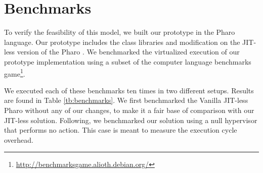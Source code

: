 %

\section{Benchmarks}

To verify the feasibility of this model, we built our \Vtt prototype in the Pharo language. Our prototype includes the \Vtt class libraries and modification on the JIT-less version of the Pharo \VM.
We benchmarked the virtualized execution of our prototype implementation using a subset of the computer language benchmarks game\footnote{\url{http://benchmarksgame.alioth.debian.org/}}.

We executed each of these benchmarks ten times in two different setups. Results are found in Table \ref{tb:benchmarks}. We first benchmarked the Vanilla JIT-less Pharo \VM without any of our changes, to make it a fair base of comparison with our JIT-less solution. Following, we benchmarked our solution using a null hypervisor that performs no action. This case is meant to measure the execution cycle overhead.



